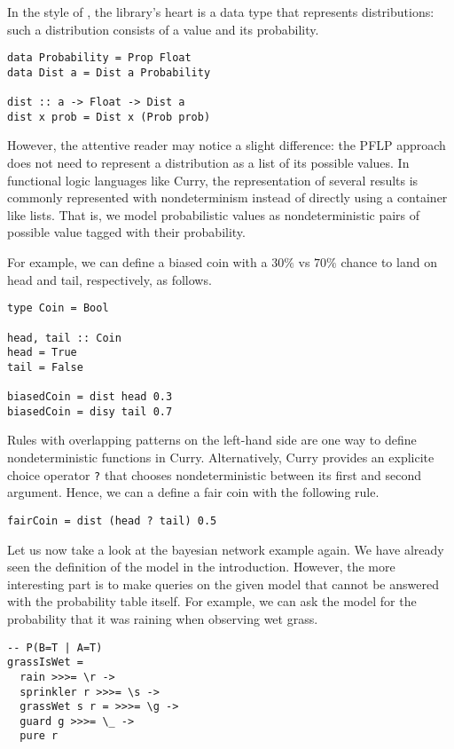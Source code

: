 \documentclass[
12pt, %
a4paper, %
oneside, %
]{llncs}
\newcommand{\code}[1]{{\texttt{#1}}}
\begin{document}
In the style of \cite{pfp}, the library's heart is a data type that
represents distributions: such a distribution consists of a value and
its probability. %

\begin{verbatim}
data Probability = Prop Float
data Dist a = Dist a Probability

dist :: a -> Float -> Dist a
dist x prob = Dist x (Prob prob)
\end{verbatim}

However, the attentive reader may notice a slight difference: the PFLP
approach does not need to represent a distribution as a list of its
possible values. %
In functional logic languages like Curry, the representation of
several results is commonly represented with nondeterminism instead of
directly using a container like lists. %
That is, we model probabilistic values as nondeterministic pairs of
possible value tagged with their probability. %

For example, we can define a biased coin with a $30\%$ vs $70\%$
chance to land on head and tail, respectively, as follows. %

\begin{verbatim}
type Coin = Bool

head, tail :: Coin
head = True
tail = False

biasedCoin = dist head 0.3
biasedCoin = disy tail 0.7
\end{verbatim}

Rules with overlapping patterns on the left-hand side are one way to
define nondeterministic functions in Curry. %
Alternatively, Curry provides an explicite choice operator \code{?}
that chooses nondeterministic between its first and second
argument. %
Hence, we can a define a fair coin with the following rule. %

\begin{verbatim}
fairCoin = dist (head ? tail) 0.5
\end{verbatim}

Let us now take a look at the bayesian network example again. %
We have already seen the definition of the model in the
introduction. %
However, the more interesting part is to make queries on the given
model that cannot be answered with the probability table itself. %
For example, we can ask the model for the probability that it was
raining when observing wet grass. %

\begin{verbatim}
-- P(B=T | A=T)
grassIsWet =
  rain >>>= \r ->
  sprinkler r >>>= \s ->
  grassWet s r = >>>= \g ->
  guard g >>>= \_ ->
  pure r
\end{verbatim}
\end{document}
